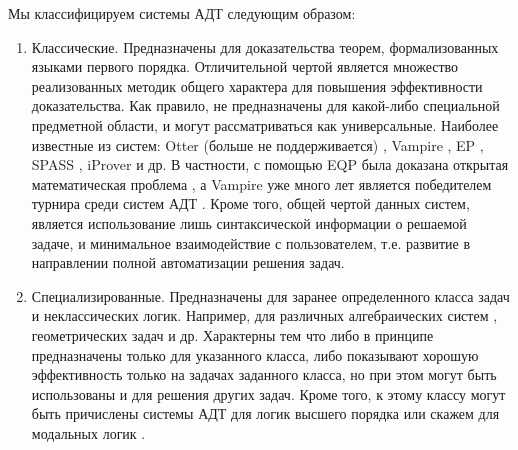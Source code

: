 Мы классифицируем системы АДТ следующим образом:
\begin{enumerate}
\item Классические. Предназначены для доказательства теорем, формализованных языками первого порядка. Отличительной чертой является множество реализованных методик общего характера для повышения эффективности доказательства. Как правило, не предназначены для какой-либо специальной предметной области, и могут рассматриваться как универсальные. Наиболее известные из систем: Otter (больше не поддерживается) \cite{otter}, Vampire \cite{vprover}, EP \cite{eprover}, SPASS \cite{SPASS}, iProver \cite{iprover} и др.  В частности,  с помощью EQP \cite{EQP} была доказана открытая математическая проблема \cite{McCuneRob}, а Vampire уже много лет является победителем турнира среди систем АДТ \cite{CASC}. Кроме того, общей чертой данных систем, является использование лишь синтаксической информации о решаемой задаче, и минимальное взаимодействие с пользователем, т.е. развитие в направлении полной автоматизации решения задач.

\item Специализированные. Предназначены для заранее определенного класса задач и неклассических логик. Например, для различных алгебраических систем \cite{tptp}, геометрических задач \cite{ATP_geometry, tptp} и др. Характерны тем что либо в принципе предназначены только для указанного класса, либо показывают хорошую эффективность только на задачах заданного класса, но при этом могут быть использованы и для решения других задач. Кроме того, к этому классу могут быть причислены системы АДТ для логик высшего порядка \cite{HOLprover} или скажем для модальных логик \cite{ModalProver}.


\end{enumerate}
